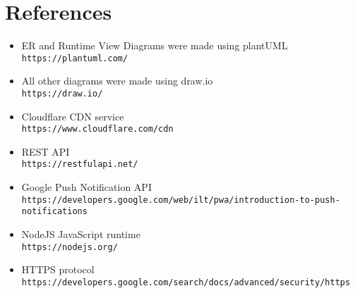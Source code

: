 
\section{References}
\begin{itemize}
    \item ER and Runtime View Diagrams were made using plantUML\\\texttt{https://plantuml.com/}
    \item All other diagrams were made using draw.io\\\texttt{https://draw.io/}
    \item Cloudflare CDN service\\\texttt{https://www.cloudflare.com/cdn}
    \item REST API\\\texttt{https://restfulapi.net/}
    \item Google Push Notification API\\\texttt{https://developers.google.com/web/ilt/pwa/introduction-to-push-notifications}
    \item NodeJS JavaScript runtime\\\texttt{https://nodejs.org/}
    \item HTTPS protocol\\\texttt{https://developers.google.com/search/docs/advanced/security/https}
\end{itemize}
